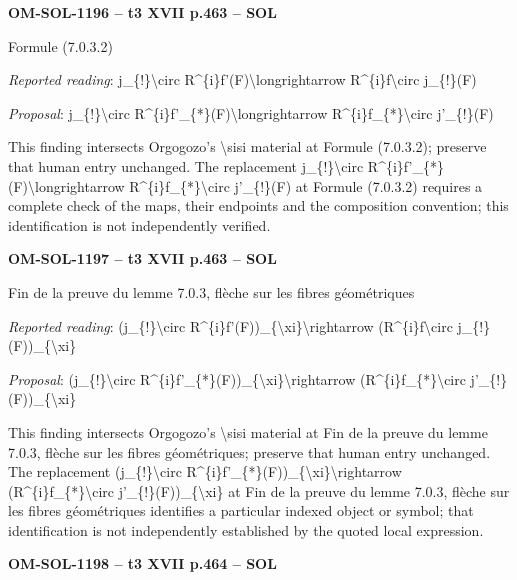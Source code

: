 \par\noindent\textbf{OM-SOL-1196 -- t3 XVII p.463 -- SOL}\par
Formule (7.0.3.2)\par
\emph{Reported reading}: j\_\{!\}\textbackslash{}circ R\textasciicircum{}\{i\}f'(F)\textbackslash{}longrightarrow R\textasciicircum{}\{i\}f\textbackslash{}circ j\_\{!\}(F)\par
\emph{Proposal}: j\_\{!\}\textbackslash{}circ R\textasciicircum{}\{i\}f'\_\{*\}(F)\textbackslash{}longrightarrow R\textasciicircum{}\{i\}f\_\{*\}\textbackslash{}circ j'\_\{!\}(F)\par
This finding intersects Orgogozo's \textbackslash{}sisi material at Formule (7.0.3.2); preserve that human entry unchanged. The replacement j\_\{!\}\textbackslash{}circ R\textasciicircum{}\{i\}f'\_\{*\}(F)\textbackslash{}longrightarrow R\textasciicircum{}\{i\}f\_\{*\}\textbackslash{}circ j'\_\{!\}(F) at Formule (7.0.3.2) requires a complete check of the maps, their endpoints and the composition convention; this identification is not independently verified.\par
\par\noindent\textbf{OM-SOL-1197 -- t3 XVII p.463 -- SOL}\par
Fin de la preuve du lemme 7.0.3, flèche sur les fibres géométriques\par
\emph{Reported reading}: (j\_\{!\}\textbackslash{}circ R\textasciicircum{}\{i\}f'(F))\_\{\textbackslash{}xi\}\textbackslash{}rightarrow (R\textasciicircum{}\{i\}f\textbackslash{}circ j\_\{!\}(F))\_\{\textbackslash{}xi\}\par
\emph{Proposal}: (j\_\{!\}\textbackslash{}circ R\textasciicircum{}\{i\}f'\_\{*\}(F))\_\{\textbackslash{}xi\}\textbackslash{}rightarrow (R\textasciicircum{}\{i\}f\_\{*\}\textbackslash{}circ j'\_\{!\}(F))\_\{\textbackslash{}xi\}\par
This finding intersects Orgogozo's \textbackslash{}sisi material at Fin de la preuve du lemme 7.0.3, flèche sur les fibres géométriques; preserve that human entry unchanged. The replacement (j\_\{!\}\textbackslash{}circ R\textasciicircum{}\{i\}f'\_\{*\}(F))\_\{\textbackslash{}xi\}\textbackslash{}rightarrow (R\textasciicircum{}\{i\}f\_\{*\}\textbackslash{}circ j'\_\{!\}(F))\_\{\textbackslash{}xi\} at Fin de la preuve du lemme 7.0.3, flèche sur les fibres géométriques identifies a particular indexed object or symbol; that identification is not independently established by the quoted local expression.\par
\par\noindent\textbf{OM-SOL-1198 -- t3 XVII p.464 -- SOL}\par
